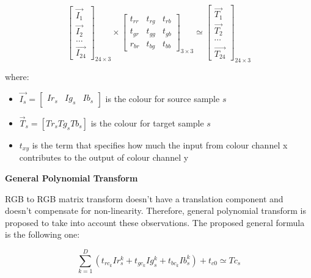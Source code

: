 \begin{equation}
    \left[\begin{array}{c}
    {\overrightarrow{I_{1}}} \\
    {\overrightarrow{I_{2}}} \\
    {\ldots} \\
    {\overrightarrow{I_{24}}}
    \end{array}\right]_{24 \times 3} \times\left[\begin{array}{ccc}
    {t_{r r}} & {t_{r g}} & {t_{r b}} \\
    {t_{g r}} & {t_{g g}} & {t_{g b}} \\
    {r_{b r}} & {t_{b g}} & {t_{b b}}
    \end{array}\right]_{3 \times 3} \simeq\left[\begin{array}{c}
    {\overrightarrow{T_{1}}} \\
    {\overrightarrow{T_{2}}} \\
    {\cdots} \\
    {\overrightarrow{T_{24}}}
    \end{array}\right]_{24 \times 3}
    \label{equation:rgbTOrgb}
\end{equation}

where:

\begin{itemize}
    \item $\overrightarrow{I_{s}}=\left[\begin{array}{lll}{I r_{s}} & {I g_{s}} & {I b_{s}}\end{array}\right]$ is the colour for source sample $s$
    \item $\vec{T}_{s}=\left[Tr_{s}  T g_{s}  T b_{s}\right]$ is the colour for target sample $s$
    \item $t_{x y}$ is the term that specifies how much the input from
colour channel x contributes to the output of colour channel y
\end{itemize}



\textbf{General Polynomial Transform}

RGB to RGB matrix transform doesn't have a translation component and doesn't compensate for non-linearity. Therefore, general polynomial transform is proposed to take into account these observations. The proposed general formula is the following one:

\begin{equation}
    \sum_{k=1}^{D}\left(t_{r c_{k}} I r_{s}^{k}+t_{g c_{k}} I g_{s}^{k}+t_{b c_{k}} I b_{s}^{k}\right)+t_{c 0} \simeq T c_{s}
\label{equation:general_polynomial_transform}
\end{equation}

